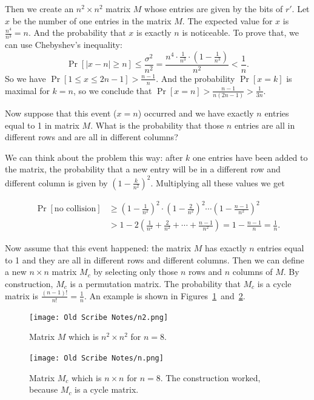 \documentclass[12pt]{tufte-book}
\begin{document}
Then we create an $n^2\times n^2$ matrix $M$ whose entries are given by the bits of $r'$.
Let $x$ be the number of one entries in the matrix $M$.
The expected value for $x$ is $\frac{n^4}{n^3}=n$.
And the probability that $x$ is exactly $n$ is noticeable. To prove that, we can use
Chebyshev's inequality:
$$\Pr[|x-n|\geq n]\leq\frac{\sigma^2}{n^2}=
\frac{n^4\cdot \frac{1}{n^3}\cdot\left(1-\frac{1}{n^3}\right)}{n^2}<\frac{1}{n}.$$
So we have $\Pr[1\leq x\leq 2n-1]>\frac{n-1}{n}$.
And the probability $\Pr[x=k]$ is maximal for $k=n$, so we conclude that
$\Pr[x=n]>\frac{n-1}{n(2n-1)}>\frac{1}{3n}$.

Now suppose that this event ($x=n$) occurred and we have exactly $n$ entries equal to 1
in matrix $M$. What is the probability that those $n$ entries are all in different rows
and are all in different columns?

We can think about the problem this way: after $k$ one entries have been added to the matrix,
the probability that a new entry will be in a different row and different column is given by
$\left(1-\frac{k}{n^2}\right)^2$. Multiplying all these values we get

\begin{align*}
\Pr[\text{no collision}] &\geq \left(1-\frac{1}{n^2}\right)^2 \cdot \left(1-\frac{2}{n^2}\right)^2
\cdots \left(1-\frac{n-1}{n^2}\right)^2 \\
& > 1 - 2\left(\frac{1}{n^2} + \frac{2}{n^2} +\cdots + \frac{n-1}{n^2}\right)
= 1 - \frac{n-1}{n} = \frac{1}{n}.
\end{align*}

Now assume that this event happened: the matrix $M$ has exactly $n$ entries equal to 1
and they are all in different rows and different columns.
Then we can define a new $n\times n$ matrix $M_c$ by selecting only those $n$ rows
and $n$ columns of $M$. By construction, $M_c$ is a permutation matrix.
The probability that $M_c$ is a cycle matrix is $\frac{(n-1)!}{n!}=\frac{1}{n}$.
An example is shown in Figures~\ref{fig:n2}~and~\ref{fig:n}.

\begin{figure}[ht]
	\centering
		\texttt{[image: Old Scribe Notes/n2.png]}
	\caption{Matrix $M$ which is $n^2\times n^2$ for $n=8$.}
	\label{fig:n2}
\end{figure}

\begin{figure}[ht]
	\centering
		\texttt{[image: Old Scribe Notes/n.png]}
	\caption{Matrix $M_c$ which is $n\times n$ for $n=8$. The construction worked,
	         because $M_c$ is a cycle matrix.}
	\label{fig:n}
\end{figure}
\end{document}
